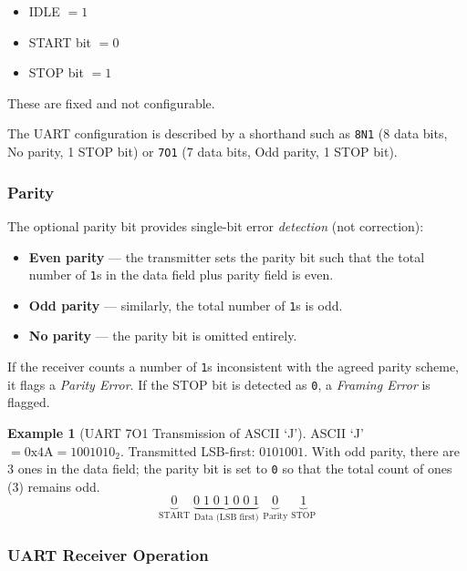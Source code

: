 \documentclass[11pt, a4paper, notitlepage]{report}
\theoremstyle{definition}
\theoremstyle{remark}
\theoremstyle{definition}
\newtheorem{example}[theorem]{Example}
\begin{document}
\begin{keyresult}[title={Key Result: UART Fixed Logic Levels}]
  \begin{itemize}[nosep]
    \item IDLE $= 1$
    \item START bit $= 0$
    \item STOP bit $= 1$
  \end{itemize}
  These are fixed and not configurable.
\end{keyresult}

The UART configuration is described by a shorthand such as \texttt{8N1} (8 data bits, No parity, 1 STOP bit) or \texttt{7O1} (7 data bits, Odd parity, 1 STOP bit).

\subsubsection{Parity}

The optional parity bit provides single-bit error \emph{detection} (not correction):
\begin{itemize}
  \item \textbf{Even parity} — the transmitter sets the parity bit such that the total number of \texttt{1}s in the data field plus parity field is even.
  \item \textbf{Odd parity} — similarly, the total number of \texttt{1}s is odd.
  \item \textbf{No parity} — the parity bit is omitted entirely.
\end{itemize}

If the receiver counts a number of \texttt{1}s inconsistent with the agreed parity scheme, it flags a \emph{Parity Error}. If the STOP bit is detected as \texttt{0}, a \emph{Framing Error} is flagged.

\begin{example}[UART 7O1 Transmission of ASCII `J']
  \label{ex:uart}
  ASCII `J' $= 0\text{x}4\text{A} = 1001010_2$. Transmitted LSB-first: $0101001$. With odd parity, there are 3 ones in the data field; the parity bit is set to \texttt{0} so that the total count of ones (3) remains odd.
  \[
    \underbrace{0}_{\text{START}}\;
    \underbrace{0\;1\;0\;1\;0\;0\;1}_{\text{Data (LSB first)}}\;
    \underbrace{0}_{\text{Parity}}\;
    \underbrace{1}_{\text{STOP}}
  \]
\end{example}

\subsubsection{UART Receiver Operation}
\end{document}
